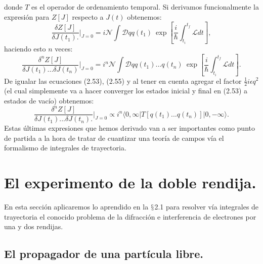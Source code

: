 donde $T$ es el operador de ordenamiento temporal. Si derivamos funcionalmente la expresión para $Z[J]$ respecto a $J(t)$ obtenemos:
\begin{equation}
\frac{\delta Z[J]}{\delta J(t_{1}).}\bigg|_{J=0}=i\mathcal{N}\int\mathcal{D}qq(t_{1})\ \exp\left[\frac{i}{\hbar}\int_{t_{i}}^{t_{f}}\mathcal{L}dt\right],
\end{equation}	
haciendo esto $n$ veces:
\begin{equation}
\frac{\delta^{n}Z[J]}{\delta J(t_{1})...\delta J(t_{n})}\bigg|_{J=0}=i^{n}\mathcal{N}\int\mathcal{D}qq(t_{1})...q(t_{n})\ \exp\left[\frac{i}{\hbar}\int_{t_{i}}^{t_{f}}\mathcal{L}dt\right].
\end{equation}
De igualar las ecuaciones (2.53), (2.55) y al tener en cuenta agregar el factor $\frac{1}{2}i\epsilon q^2$ (el cual simplemente va a hacer converger los estados inicial y final en (2.53) a estados de vacío) obtenemos:
\begin{equation}
\frac{\delta^{n}Z[J]}{\delta J(t_{1})...\delta J(t_{n}).}\bigg|_{J=0}\propto i^{n}\langle0,\infty|T[q(t_{1})...q(t_{n})]|0,-\infty\rangle .
\end{equation}
Estas últimas expresiones que hemos derivado van a ser importantes como punto de partida a la hora de tratar de cuantizar una teoría de campos vía el formalismo de integrales de trayectoria.
\newpage


\section{El experimento de la doble rendija.}
En esta sección aplicaremos lo aprendido en la $\mathsection$2.1 para resolver vía integrales de trayectoria el conocido problema de la difracción e interferencia de electrones por una y dos rendijas. 

\subsection{El propagador de una partícula libre.}


